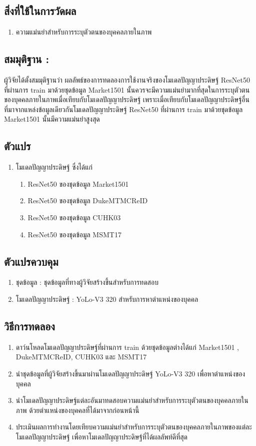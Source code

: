 \subsection*{สิ่งที่ใช้ในการวัดผล}
	\begin{enumerate}
		\item ความแม่นยำสำหรับการระบุตัวตนของบุคคลภายในภาพ
	\end{enumerate}
\subsection*{สมมุติฐาน :}ผู้วิจัยได้ตั้งสมมุติฐานว่า ผลลัพธ์ของการทดลองการใช้งานจริงของโมเดลปัญญาประดิษฐ์ ResNet50 ที่ผ่านการ train มาด้วยชุดข้อมูล Market1501 นั้นควรจะมีความแม่นยำมากที่สุดในการระบุตัวตนของบุคคลภายในภาพเมื่อเทียบกับโมเดลปัญญาประดิษฐ์ เพราะเมื่อเทียบกับโมเดลปัญญาประดิษฐ์อื่นที่มาจากแหล่งข้อมูลเดียวกันโมเดลปัญญาประดิษฐ์ ResNet50 ที่ผ่านการ train มาด้วยชุดข้อมูล Market1501 นั้นมีความแม่นยำสูงสุด
\subsection*{ตัวแปร}
	\begin{enumerate}
		\item โมเดลปัญญาประดิษฐ์ ซึ่งได้แก่
		\begin{enumerate}
			\item ResNet50 ของชุดข้อมูล Market1501
			\item ResNet50 ของชุดข้อมูล DukeMTMCReID
			\item ResNet50 ของชุดข้อมูล CUHK03	
			\item ResNet50 ของชุดข้อมูล MSMT17
		\end{enumerate}
	\end{enumerate}
\subsection*{ตัวแปรควบคุม}
	\begin{enumerate}
		\item ชุดข้อมูล : ชุดข้อมูลที่ทางผู้วิจัยสร้างขึ้นสำหรับการทดสอบ
		\item โมเดลปัญญาประดิษฐ์ : YoLo-V3 320  สำหรับการหาตำแหน่งของบุคคล
	\end{enumerate}
\subsection*{วิธีการทดลอง}
	\begin{enumerate}
		\item ดาว์นโหลดโมเดลปัญญาประดิษฐ์ที่ผ่านการ train ด้วยชุดข้อมูลต่างได้แก่ Market1501 , DukeMTMCReID, CUHK03 และ MSMT17
		\item นำชุดข้อมูลที่ผู้วิจัยสร้างขึ้นมาผ่านโมเดลปัญญาประดิษฐ์ YoLo-V3 320 เพื่อหาตำแหน่งของบุคคล
		\item นำโมเดลปัญญาประดิษฐ์แต่ละอันมาทดสอบความแม่นยำสำหรับการระบุตัวตนของบุคคลภายในภาพ ด้วยตำแหน่งของบุคคลที่ได้มาจากก่อนหน้านี้
		\item ประเมินผลการทำงานโดยเทียบความแม่นยำสำหรับการระบุตัวตนของบุคคลภายในภาพของแต่ละโมเดลปัญญาประดิษฐ์ เพื่อหาโมเดลปัญญาประดิษฐ์ที่ได้ผลลัพท์ดีที่สุด
\end{enumerate}
